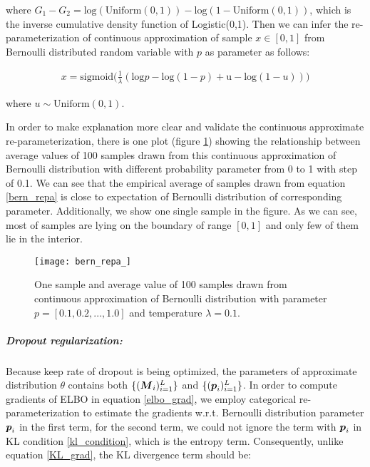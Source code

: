where $G_1 - G_2 = \text{log}(\text{Uniform}(0,1)) - \text{log}(1-\text{Uniform}(0,1))$, which is the inverse cumulative density function of Logistic(0,1).
Then we can infer the re-parameterization of continuous approximation of sample $x \in [0, 1]$ from Bernoulli distributed random variable with $p$ as parameter as follows:

\begin{equation}\label{bern_repa}
\begin{aligned}
x = \text{sigmoid}\big(
\frac{1}{\lambda} (\text{log}p - \text{log}(1-p) + \text{u} - \text{log}(1-u)) 
\big)
\end{aligned}
\end{equation}

where $u \sim \text{Uniform}(0,1)$. 

In order to make explanation more clear and validate the continuous approximate re-parameterization, there is one plot (figure \ref{fig:bern_repa}) showing the relationship between average values of 100 samples drawn from this continuous approximation of Bernoulli distribution with different probability parameter from 0 to 1 with step of 0.1. We can see that the empirical average of samples drawn from equation \ref{bern_repa} is close to expectation of Bernoulli distribution of corresponding parameter. Additionally, we show one single sample in the figure. As we can see, most of samples are lying on the boundary of range $[0,1]$ and only few of them lie in the interior.
\begin{figure}[h!]
	\begin{center}
		\texttt{[image: bern\_repa\_]}
		\caption{One sample and average value of 100 samples drawn from continuous approximation of Bernoulli distribution with parameter $p = [0.1, 0.2, ..., 1.0]$ and temperature $ \lambda =0.1$.}		
		\label{fig:bern_repa}
	\end{center}
\end{figure}

\subparagraph{Dropout regularization:}
Because keep rate of dropout is being optimized, the parameters of approximate distribution $\theta$ contains both $\{ (\boldsymbol M_i)_{i=1}^{L} \}$ and $\{(\boldsymbol p_i)_{i=1}^{L} \}$. In order to compute gradients of ELBO in equation \ref{elbo_grad}, we employ categorical re-parameterization to estimate the gradients w.r.t. Bernoulli distribution parameter $\boldsymbol p_i$ in the first term, for the second term, we could not ignore the term with $\boldsymbol p_i$ in KL condition \ref{kl_condition}, which is the entropy term. Consequently, unlike equation \ref{KL_grad}, the KL divergence term should be:

